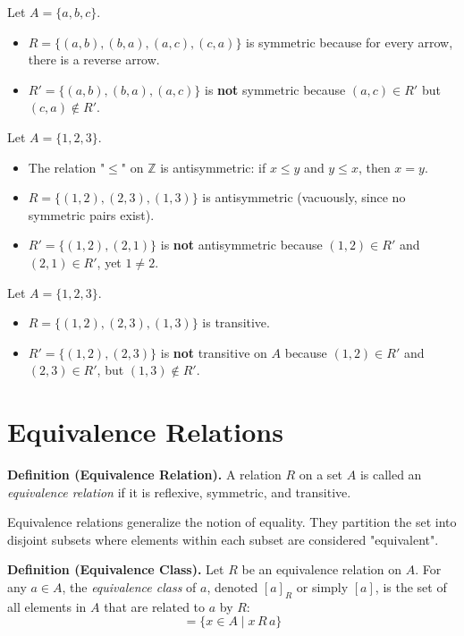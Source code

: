 \documentclass[11pt,a4paper]{article}
\begin{document}
\begin{example}[Symmetric]
Let $A = \{a, b, c\}$.
\begin{itemize}
    \item $R = \{(a,b), (b,a), (a,c), (c,a)\}$ is symmetric because for every arrow, there is a reverse arrow.
    \item $R' = \{(a,b), (b,a), (a,c)\}$ is \textbf{not} symmetric because $(a,c) \in R'$ but $(c,a) \notin R'$.
\end{itemize}
\end{example}

\begin{example}[Antisymmetric]
Let $A = \{1, 2, 3\}$.
\begin{itemize}
    \item The relation "$\leq$" on $\mathbb{Z}$ is antisymmetric: if $x \leq y$ and $y \leq x$, then $x = y$.
    \item $R = \{(1,2), (2,3), (1,3)\}$ is antisymmetric (vacuously, since no symmetric pairs exist).
    \item $R' = \{(1,2), (2,1)\}$ is \textbf{not} antisymmetric because $(1,2) \in R'$ and $(2,1) \in R'$, yet $1 \neq 2$.
\end{itemize}
\end{example}

\begin{example}[Transitive]
Let $A = \{1, 2, 3\}$.
\begin{itemize}
    \item $R = \{(1,2), (2,3), (1,3)\}$ is transitive.
    \item $R' = \{(1,2), (2,3)\}$ is \textbf{not} transitive on $A$ because $(1,2) \in R'$ and $(2,3) \in R'$, but $(1,3) \notin R'$.
\end{itemize}
\end{example}

\section{Equivalence Relations}

\textbf{Definition (Equivalence Relation).} A relation $R$ on a set $A$ is called an \textit{equivalence relation} if it is reflexive, symmetric, and transitive.

Equivalence relations generalize the notion of equality. They partition the set into disjoint subsets where elements within each subset are considered "equivalent".

\textbf{Definition (Equivalence Class).} Let $R$ be an equivalence relation on $A$. For any $a \in A$, the \textit{equivalence class} of $a$, denoted $[a]_R$ or simply $[a]$, is the set of all elements in $A$ that are related to $a$ by $R$:
\begin{equation*}
    [a] = \{x \in A \mid x \, R \, a\}
\end{equation*}
\end{document}
